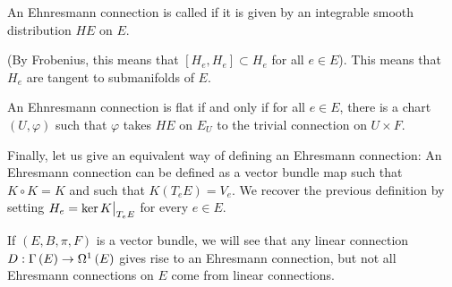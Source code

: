 \documentclass[main.tex]{subfiles}
\begin{document}
\begin{defn}
  An Ehnresmann connection is called  if it is given by an integrable smooth distribution $HE$ on $E$.
\end{defn}
(By Frobenius, this means that $[H_e, H_e] \subset H_e$ for all $e \in E$). This means that $H_e$ are tangent to submanifolds of $E$.

\begin{note}
  An Ehnresmann connection is flat if and only if for all $e \in E$, there is a chart $(U, \varphi)$ such that $\varphi$ takes $HE$ on $E_U$ to the trivial connection on $U \times F.$
\end{note}

Finally, let us give an equivalent way of defining an Ehresmann connection: An Ehresmann connection can be defined as a vector bundle map  such that $K \circ K = K$  and such that $K(T_eE) = V_e$. We recover the previous definition by setting $H_e = \ker K\big|_{T_eE}$ for every $e \in E$.

\begin{rmk}
  If $(E, B, \pi, F)$ is a vector bundle, we will see that any linear connection $D : \Gamma\left( E \right) \to \Omega^{1}\left( E \right)$ gives rise to an Ehresmann connection, but not all Ehresmann connections on $E$ come from linear connections.
\end{rmk}
\end{document}
